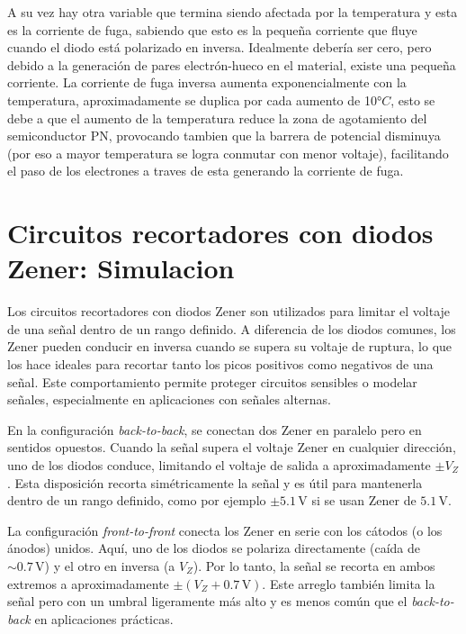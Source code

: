 \documentclass[chaptersright]{informeutn}
\begin{document}
      A su vez hay otra variable que termina siendo afectada por la temperatura y esta es la corriente de fuga,
      sabiendo que esto es la pequeña corriente que fluye cuando el diodo está polarizado en inversa. Idealmente
      debería ser cero, pero debido a la generación de pares electrón-hueco en el material, existe una pequeña
      corriente. La corriente de fuga inversa aumenta exponencialmente con la temperatura, aproximadamente se
      duplica por cada aumento de 10$°C$, esto se debe a que el aumento de la temperatura reduce la zona de
      agotamiento del semiconductor PN, provocando tambien que la barrera de potencial disminuya (por eso a mayor
      temperatura se logra conmutar con menor voltaje), facilitando el paso de los electrones a traves de esta
      generando la corriente de fuga.

    \chapter{Circuitos recortadores con diodos Zener: Simulacion}
      Los circuitos recortadores con diodos Zener son utilizados para limitar el voltaje de una señal dentro de un
      rango definido. A diferencia de los diodos comunes, los Zener pueden conducir en inversa cuando se supera su
      voltaje de ruptura, lo que los hace ideales para recortar tanto los picos positivos como negativos de una señal.
      Este comportamiento permite proteger circuitos sensibles o modelar señales, especialmente en aplicaciones con
      señales alternas.

      En la configuración \textit{back-to-back}, se conectan dos Zener en paralelo pero en sentidos opuestos. Cuando la
      señal supera el voltaje Zener en cualquier dirección, uno de los diodos conduce, limitando el voltaje de salida
      a aproximadamente $\pm V_Z$. Esta disposición recorta simétricamente la señal y es útil para mantenerla dentro de
      un rango definido, como por ejemplo $\pm 5.1\,\text{V}$ si se usan Zener de $5.1\,\text{V}$.

      La configuración \textit{front-to-front} conecta los Zener en serie con los cátodos (o los ánodos) unidos. Aquí,
      uno de los diodos se polariza directamente (caída de $\sim 0.7\,\text{V}$) y el otro en inversa (a $V_Z$). Por lo
      tanto, la señal se recorta en ambos extremos a aproximadamente $\pm (V_Z + 0.7\,\text{V})$. Este arreglo también
      limita la señal pero con un umbral ligeramente más alto y es menos común que el \textit{back-to-back} en
      aplicaciones prácticas.
\end{document}
